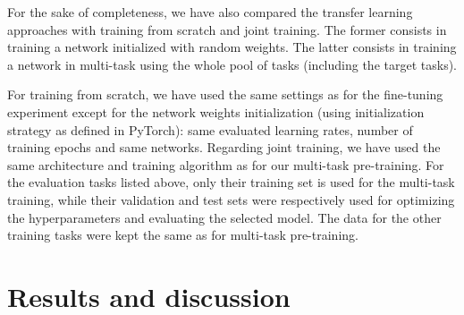 For the sake of completeness, we have also compared the transfer learning approaches with training from scratch and joint training. The former consists in training a network initialized with random weights. The latter consists in training a network in multi-task using the whole pool of tasks (including the target tasks). 

For training from scratch, we have used the same settings as for the fine-tuning experiment except for the network weights initialization (using initialization strategy as defined in PyTorch): same evaluated learning rates, number of training epochs and same networks. Regarding joint training, we have used the same architecture and training algorithm as for our multi-task pre-training. For the evaluation tasks listed above, only their training set is used for the multi-task training, while their validation and test sets were respectively used for optimizing the hyperparameters and evaluating the selected model. The data for the other training tasks were kept the same as for multi-task pre-training.

\section{Results and discussion}
\label{sec:mtask:results}


